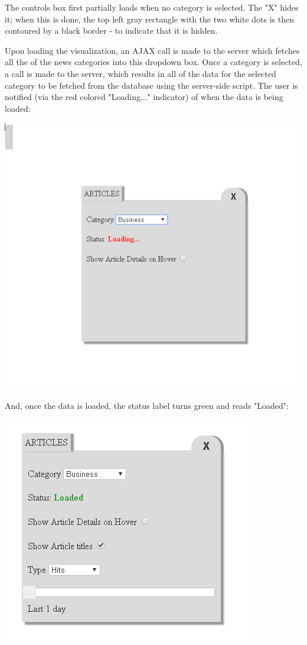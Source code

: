 \documentclass[12pt]{article}
\begin{document}
\noindent The controls box first partially loads when no category is selected. The "X" hides it; when this is done, the top left gray rectangle with the two white dots is then contoured by a black border - to indicate that it is hidden.

Upon loading the visualization, an AJAX call is made to the server which fetches all the of the news categories into this dropdown box. Once a category is selected, a call is made to the server, which results in all of the data for the selected category to be fetched from the database using the server-side script. The user is notified (via the red colored "Loading..." indicator) of when the data is being loaded:

\noindent\includegraphics[scale=0.8]{img/viz_4}

And, once the data is loaded, the status label turns green and reads "Loaded":

\noindent\includegraphics[scale=0.8]{img/viz_5}
\end{document}
